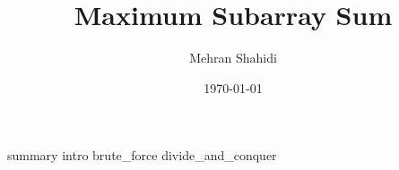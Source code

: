 \documentclass{article}
\title{Maximum Subarray Sum}
\author{Mehran Shahidi}
\date{\today}
\begin{document}
\maketitle
{}
{summary}
\newpage
\tableofcontents
\newpage
{}
{intro}
{brute_force}
{divide_and_conquer}

\newpage
\end{document}
